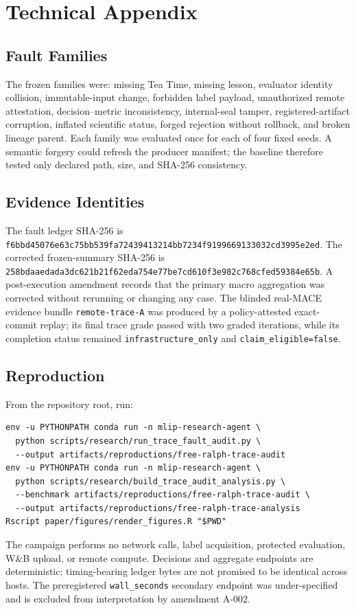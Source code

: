 \section{Technical Appendix}

\subsection{Fault Families}

The frozen families were: missing Tea Time, missing lesson, evaluator identity collision, immutable-input change, forbidden label payload, unauthorized remote attestation, decision--metric inconsistency, internal-seal tamper, registered-artifact corruption, inflated scientific status, forged rejection without rollback, and broken lineage parent. Each family was evaluated once for each of four fixed seeds. A semantic forgery could refresh the producer manifest; the baseline therefore tested only declared path, size, and SHA-256 consistency.

\subsection{Evidence Identities}

The fault ledger SHA-256 is \texttt{f6bbd45076e63c75bb539fa72439413214bb7234f9199669133032cd3995e2ed}. The corrected frozen-summary SHA-256 is \texttt{258bdaaedada3dc621b21f62eda754e77be7cd610f3e982c768cfed59384e65b}. A post-execution amendment records that the primary macro aggregation was corrected without rerunning or changing any case. The blinded real-MACE evidence bundle \texttt{remote-trace-A} was produced by a policy-attested exact-commit replay; its final trace grade passed with two graded iterations, while its completion status remained \texttt{infrastructure\_only} and \texttt{claim\_eligible=false}.

\subsection{Reproduction}

From the repository root, run:

\begin{verbatim}
env -u PYTHONPATH conda run -n mlip-research-agent \
  python scripts/research/run_trace_fault_audit.py \
  --output artifacts/reproductions/free-ralph-trace-audit
env -u PYTHONPATH conda run -n mlip-research-agent \
  python scripts/research/build_trace_audit_analysis.py \
  --benchmark artifacts/reproductions/free-ralph-trace-audit \
  --output artifacts/reproductions/free-ralph-trace-analysis
Rscript paper/figures/render_figures.R "$PWD"
\end{verbatim}

The campaign performs no network calls, label acquisition, protected evaluation, W\&B upload, or remote compute. Decisions and aggregate endpoints are deterministic; timing-bearing ledger bytes are not promised to be identical across hosts. The preregistered \texttt{wall\_seconds} secondary endpoint was under-specified and is excluded from interpretation by amendment A-002.
